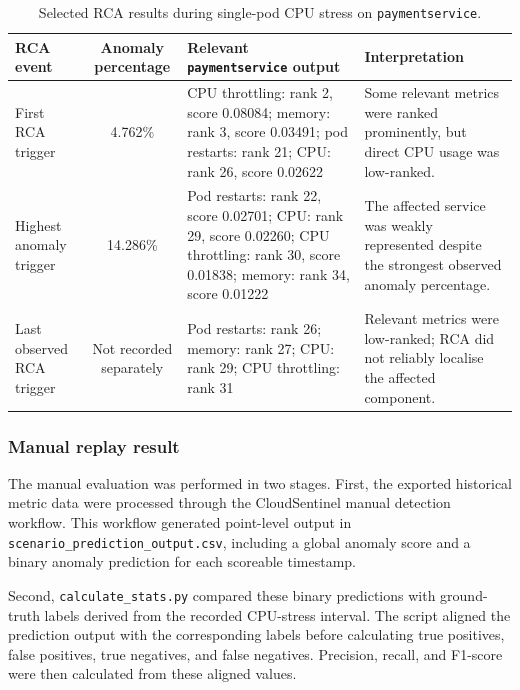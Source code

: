\begin{table}[htbp]
    \centering
    \scriptsize
    \caption{Selected RCA results during single-pod CPU stress on \texttt{paymentservice}.}
    \label{tab:paymentservice-cpu-rca}
    \begin{tabularx}{\textwidth}{l c X X}
        \toprule
        \textbf{RCA event} & \textbf{Anomaly percentage} & \textbf{Relevant \texttt{paymentservice} output} & \textbf{Interpretation} \\
        \midrule
        First RCA trigger
        & 4.762\%
        & CPU throttling: rank 2, score 0.08084; memory: rank 3, score 0.03491; pod restarts: rank 21; CPU: rank 26, score 0.02622
        & Some relevant metrics were ranked prominently, but direct CPU usage was low-ranked. \\

        Highest anomaly trigger
        & 14.286\%
        & Pod restarts: rank 22, score 0.02701; CPU: rank 29, score 0.02260; CPU throttling: rank 30, score 0.01838; memory: rank 34, score 0.01222
        & The affected service was weakly represented despite the strongest observed anomaly percentage. \\

        Last observed RCA trigger
        & Not recorded separately
        & Pod restarts: rank 26; memory: rank 27; CPU: rank 29; CPU throttling: rank 31
        & Relevant metrics were low-ranked; RCA did not reliably localise the affected component. \\
        \bottomrule
    \end{tabularx}
\end{table}

\subsubsection{Manual replay result}
The manual evaluation was performed in two stages. First, the exported historical metric data were processed through the CloudSentinel manual detection workflow. This workflow generated point-level output in \texttt{scenario\_prediction\_output.csv}, including a global anomaly score and a binary anomaly prediction for each scoreable timestamp.

Second, \texttt{calculate\_stats.py} compared these binary predictions with ground-truth labels derived from the recorded CPU-stress interval. The script aligned the prediction output with the corresponding labels before calculating true positives, false positives, true negatives, and false negatives. Precision, recall, and F1-score were then calculated from these aligned values.

